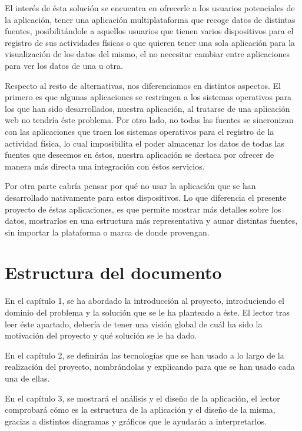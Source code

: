 \documentclass[11pt,openany]{book}
\begin{document}
El interés de ésta solución se encuentra en ofrecerle a los usuarios potenciales de la aplicación, tener una aplicación multiplataforma que recoge datos de distintas fuentes, posibilitándole a aquellos usuarios que tienen varios dispositivos para el registro de sus actividades físicas o que quieren tener una sola aplicación para la visualización de los datos del mismo, el no necesitar cambiar entre aplicaciones para ver los datos de una u otra.

Respecto al resto de alternativas, nos diferenciamos en distintos aspectos. El primero es que algunas aplicaciones se restringen a los sistemas operativos para los que han sido desarrollados, nuestra aplicación, al tratarse de una aplicación web no tendría éste problema. Por otro lado, no todas las fuentes se sincronizan con las aplicaciones que traen los sistemas operativos para el registro de la actividad física, lo cual imposibilita el poder almacenar los datos de todas las fuentes que deseemos en éstos, nuestra aplicación se destaca por ofrecer de manera más directa una integración con éstos servicios. 

Por otra parte cabría pensar por qué no usar la aplicación que se han desarrollado nativamente para estos dispositivos. Lo que diferencia el presente proyecto de éstas aplicaciones, es que permite mostrar más detalles sobre los datos, mostrarlos en una estructura más representativa y aunar distintas fuentes, sin importar la plataforma o marca de donde provengan.

\section{Estructura del documento}

En el capítulo 1, se ha abordado la introducción al proyecto, introduciendo el dominio del problema y la solución que se le ha planteado a éste. El lector tras leer éste apartado, debería de tener una visión global de cuál ha sido la motivación del proyecto y qué solución se le ha dado.

En el capítulo 2, se definirán las tecnologías que se han usado a lo largo de la realización del proyecto, nombrándolas y explicando para que se han usado cada una de ellas.

En el capítulo 3, se mostrará el análisis y el diseño de la aplicación, el lector comprobará cómo es la estructura de la aplicación y el diseño de la misma, gracias a distintos diagramas y gráficos que le ayudarán a interpretarlos.
\end{document}
